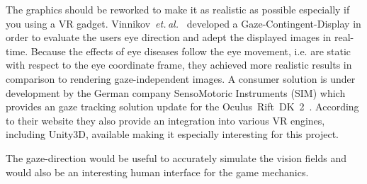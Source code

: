 \documentclass{sig-alternate-05-2015}
\newcommand{\etal}{\textit{et. al.}}
\begin{document}
The graphics should be reworked to make it as realistic as possible especially if you using a VR gadget.
%
Vinnikov \etal \cite{gazedisplays} developed a Gaze-Contingent-Display in order to evaluate the users eye direction and adept the displayed images in real-time.
Because the effects of eye diseases follow the eye movement, i.e. are static with respect to the eye coordinate frame, they achieved more realistic results in comparison to rendering gaze-independent images.
A consumer solution is under development by the German company SensoMotoric Instruments (SIM) which provides an gaze tracking solution update for the Oculus Rift DK 2 \cite{smi-oculus, arstechoculus}.
According to their website they also provide an integration into various VR engines, including Unity3D, available making it especially interesting for this project.

The gaze-direction would be useful to accurately simulate the vision fields and would also be an interesting human interface for the game mechanics.
%
\printbibliography

\balancecolumns
\end{document}
